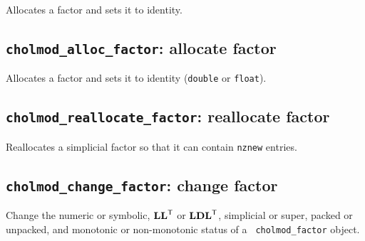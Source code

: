 \documentclass[11pt]{article}
\newcommand{\m}[1]{{\bf{#1}}}       %
\newcommand{\tr}{^{\sf T}}          %
\begin{document}

Allocates a factor and sets it to identity.

\subsection{{\tt cholmod\_alloc\_factor}: allocate factor}


Allocates a factor and sets it to identity
({\tt double} or {\tt float}).

\subsection{{\tt cholmod\_reallocate\_factor}: reallocate factor}


Reallocates a simplicial factor so that it can contain {\tt nznew} entries.

\subsection{{\tt cholmod\_change\_factor}: change factor}


Change the numeric or symbolic, $\m{LL}\tr$ or $\m{LDL}\tr$, simplicial or
super, packed or unpacked, and monotonic or non-monotonic status of a {\tt
cholmod\_factor} object.
\end{document}

